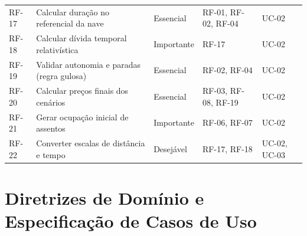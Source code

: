 \documentclass[12pt, a4paper]{article}
\begin{document}
\begin{table}[H]
\begin{tabularx}{\textwidth}{l >{\raggedright\arraybackslash}X l l l}
RF-17 & Calcular duração no referencial da nave & Essencial & RF-01, RF-02, RF-04 & UC-02 \\
RF-18 & Calcular dívida temporal relativística & Importante & RF-17 & UC-02 \\
RF-19 & Validar autonomia e paradas (regra gulosa) & Essencial & RF-02, RF-04 & UC-02 \\
RF-20 & Calcular preços finais dos cenários & Essencial & RF-03, RF-08, RF-19 & UC-02 \\
RF-21 & Gerar ocupação inicial de assentos & Importante & RF-06, RF-07 & UC-02 \\
RF-22 & Converter escalas de distância e tempo & Desejável & RF-17, RF-18 & UC-02, UC-03 \\
\bottomrule
\end{tabularx}
\end{table}

\section{Diretrizes de Domínio e Especificação de Casos de Uso}
\end{document}
